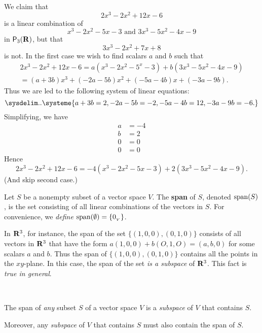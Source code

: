 \begin{example} \label{example 1.4.2}
We claim that
\[
    2x^3 - 2x^2 + 12x - 6
\]
is a linear combination of
\[
    x^3 - 2x^2 - 5x - 3 \text{ and } 3x^3 - 5x^2 - 4x - 9
\]
in \(\textsf{P}_3(\mathbf{R})\), but that
\[
    3x^3 - 2x^2 + 7x + 8
\]
is not.
In the first case we wish to find scalars \(a\) and \(b\) such that
\begin{align*}
    2x^3 - 2x^2 + 12x - 6 = a(x^3 - 2x^2 - 5^x - 3) + b(3x^3 - 5x^2 - 4x - 9) \\
    = (a + 3b)x^3 + (-2a - 5b)x^2 + (-5a - 4b)x + (-3a - 9b).
\end{align*}
Thus we are led to the following system of linear equations:
\begin{equation*}
\sysdelim..\systeme{
      a + 3b = 2,
    -2a - 5b = -2,
    -5a - 4b = 12,
    -3a - 9b = -6.}
\end{equation*}
Simplifying, we have
\begin{align*}
    a & = -4 \\
    b & = 2 \\
    0 & = 0 \\
    0 & = 0
\end{align*}
Hence
\[
    2x^3 - 2x^2 + 12x - 6 = -4(x^3 - 2x^2 - 5x - 3) + 2(3x^3 - 5x^2 - 4x - 9).
\]
(And skip second case.)
\end{example}

\begin{definition} \label{def 1.4}
Let \(S\) be a nonempty subset of a vector space \(V\).
The \textbf{span} of \(S\), denoted \(\operatorname{span}(S)\), is the set consisting of all linear combinations of the vectors in \(S\).
For convenience, we \emph{define} \(\operatorname{span}(\emptyset) = \{ 0_{_V} \}\).
\end{definition}

In \(\mathbf{R}^3\), for instance, the span of the set \(\{ (1,0,0), (0, 1,0) \}\) consists of all vectors in \(\mathbf{R}^3\) that have the form \(a(1, 0, 0) + b(O, 1, O) = (a, b, 0)\) for some scalars \(a\) and \(b\).
Thus the span of \(\{ (1, 0, 0), (0, 1, 0) \}\) contains all the points in the \(xy\)-plane.
In this case, the span of the set \emph{is a subspace} of \(\mathbf{R}^3\). This fact is \emph{true in general}.

\begin{theorem} \label{thm 1.5}\ 

 The span of \emph{any} subset \(S\) of a vector space \(V\) is a \emph{subspace} of \(V\) that contains \(S\).

 Moreover, any \emph{subspace} of \(V\) that contains \(S\) must also contain the span of \(S\).
\end{theorem}

